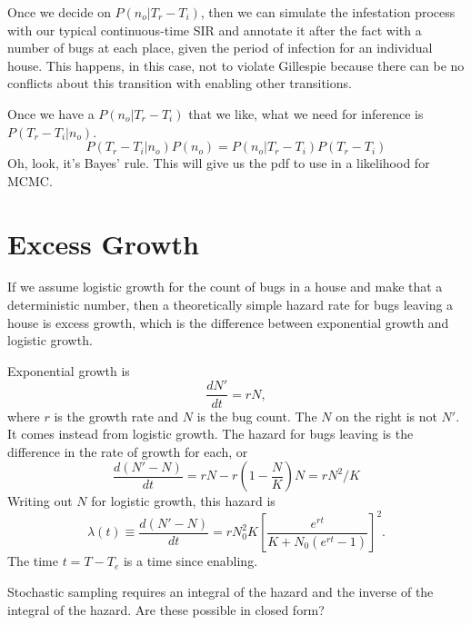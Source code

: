 \documentclass{article}
\begin{document}
Once we decide on $P(n_o|T_r-T_i)$, then we can simulate the
infestation process with our typical continuous-time SIR
and annotate it after the fact with a number of bugs at each place,
given the period of infection for an individual house.
This happens, in this case, not to violate Gillespie because there
can be no conflicts about this transition with enabling other
transitions.

Once we have a $P(n_o|T_r-T_i)$ that we like, what we need for
inference is $P(T_r-T_i|n_o)$.
\begin{equation}
  P(T_r-T_i|n_o)P(n_o)=P(n_o|T_r-T_i)P(T_r-T_i)
\end{equation}
Oh, look, it's Bayes' rule. This will give us the pdf to use
in a likelihood for MCMC.


\section{Excess Growth}
If we assume logistic growth for the count of bugs in a house
and make that a deterministic number, then a theoretically
simple hazard rate for bugs leaving a house is excess growth,
which is the difference between exponential growth and logistic growth.

Exponential growth is
\begin{equation}
  \frac{dN'}{dt}=rN,
\end{equation}
where $r$ is the growth rate and $N$ is the bug count.
The $N$ on the right is not $N'$. It comes instead from logistic
growth. The hazard for bugs leaving is the difference in the
rate of growth for each, or
\begin{equation}
  \frac{d(N'-N)}{dt}=rN-r\left(1-\frac{N}{K}\right)N=rN^2/K
\end{equation}
Writing out $N$ for logistic growth, this hazard is
\begin{equation}
  \lambda(t)\equiv\frac{d(N'-N)}{dt}=rN_0^2K\left[
    \frac{e^{rt}}{K+N_0(e^{rt}-1)}\right]^2.
\end{equation}
The time $t=T-T_e$ is a time since enabling.

Stochastic sampling requires an integral of the hazard
and the inverse of the integral of the hazard. Are these possible
in closed form?
\end{document}
